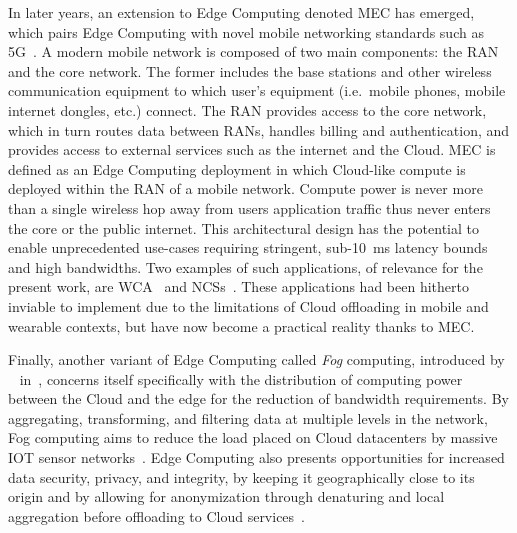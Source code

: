 %
%
In later years, an extension to Edge Computing denoted \gls{MEC} has emerged, which pairs Edge Computing with novel mobile networking standards such as 5G~\cite{hassan2019edge,pham2020survey,wan2020efficient}.
A modern mobile network is composed of two main components: the \gls{RAN} and the core network.
The former includes the base stations and other wireless communication equipment to which user's equipment (i.e.\ mobile phones, mobile internet dongles, etc.) connect. 
The \gls{RAN} provides access to the core network, which in turn routes data between \glspl{RAN}, handles billing and authentication, and provides access to external services such as the internet and the Cloud.
\gls{MEC} is defined as an Edge Computing deployment in which Cloud-like compute is deployed within the \gls{RAN} of a mobile network.
Compute power is never more than a single wireless hop away from users application traffic thus never enters the core or the public internet.
This architectural design has the potential to enable unprecedented use-cases requiring stringent, sub-\SI{10}{\milli\second} latency bounds and high bandwidths.
Two examples of such applications, of relevance for the present work, are \acl{WCA}~\cite{ha2014towards,chen2018application,wang2020scaling,chen2017empirical,chen2018application} and \aclp{NCS}~\cite{sasaki2016vehicle,wang2018bandwidth,wan2020efficient}.
These applications had been hitherto inviable to implement due to the limitations of Cloud offloading in mobile and wearable contexts, but have now become a practical reality thanks to \gls{MEC}.

Finally, another variant of Edge Computing called \emph{Fog} computing, introduced by \citeauthor{bonomi2012fog}~\cite{bonomi2012fog} in\ \citeyear{bonomi2012fog}, concerns itself specifically with the distribution of computing power between the Cloud and the edge for the reduction of bandwidth requirements.
By aggregating, transforming, and filtering data at multiple levels in the network, Fog computing aims to reduce the load placed on Cloud datacenters by massive \gls{IOT} sensor networks~\cite{yi2015survey}.
Edge Computing also presents opportunities for increased data security, privacy, and integrity, by keeping it geographically close to its origin and by allowing for anonymization through denaturing and local aggregation before offloading to Cloud services~\cite{satyanarayanan2017emergence}.

\subsection{}\label{background:xr}

